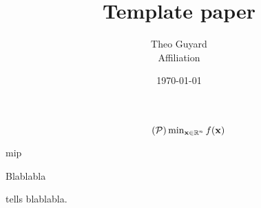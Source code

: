 \documentclass[11pt]{article}
\title{Template paper}
\author{Theo Guyard \\ \small{Affiliation}}
\date{\today}
\begin{document}
 

\maketitle

\lipsum[1]

\begin{equation}
    \tag{$\ppb$}
    \textstyle
    \min_{\pv \in \kR^{\pdim}} \lfunc(\pv)
\end{equation}

\gls{mip}
\citep{bauschke2017convex}

\begin{proposition}
    \label{prop:prop}
    Blablabla
\end{proposition}

 tells blablabla.


\end{document}
